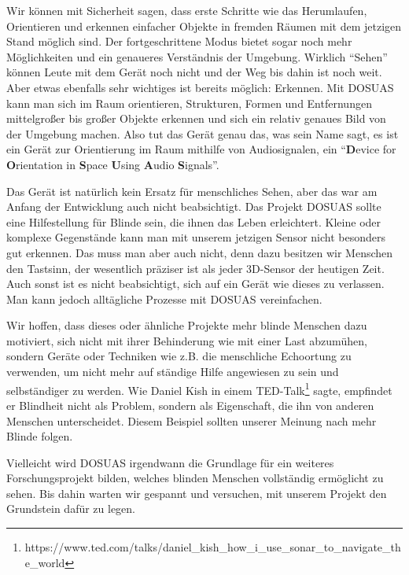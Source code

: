 \documentclass[a4paper,12pt,ngerman]{scrartcl}
\begin{document}
Wir können mit Sicherheit sagen, dass erste Schritte wie das Herumlaufen, Orientieren und erkennen einfacher
Objekte in fremden Räumen mit dem jetzigen Stand möglich sind. Der fortgeschrittene Modus bietet sogar noch mehr 
Möglichkeiten und ein genaueres Verständnis der Umgebung.
Wirklich \enquote{Sehen} können Leute mit dem Gerät noch nicht und der Weg bis dahin ist noch weit.
Aber etwas ebenfalls sehr wichtiges
ist bereits möglich: Erkennen. Mit DOSUAS kann man sich im Raum orientieren, Strukturen, Formen und Entfernungen
mittelgroßer bis großer Objekte erkennen und sich ein relativ genaues Bild von der Umgebung machen. 
Also tut das Gerät genau das, was sein Name sagt, es ist ein Gerät zur Orientierung im Raum mithilfe von Audiosignalen,
ein \enquote{\textbf{D}evice for \textbf{O}rientation in \textbf{S}pace \textbf{U}sing 
\textbf{A}udio \textbf{S}ignals}.\par 
Das Gerät ist natürlich kein Ersatz für menschliches Sehen, aber das war am Anfang der Entwicklung
auch nicht beabsichtigt. Das Projekt DOSUAS sollte eine Hilfestellung für Blinde sein, die ihnen das Leben erleichtert.
Kleine oder komplexe Gegenstände kann man mit unserem jetzigen Sensor nicht besonders gut erkennen. Das muss man aber
auch nicht, denn dazu besitzen wir Menschen den Tastsinn, der wesentlich präziser ist
als jeder 3D-Sensor der heutigen Zeit. Auch sonst ist es nicht beabsichtigt, sich auf 
ein Gerät wie dieses zu verlassen. Man kann jedoch alltägliche Prozesse mit DOSUAS vereinfachen.\par
Wir hoffen, dass dieses oder ähnliche Projekte mehr blinde Menschen dazu motiviert, sich nicht 
mit ihrer Behinderung wie mit einer Last abzumühen, sondern Geräte oder Techniken
wie z.B. die menschliche Echoortung zu verwenden, um nicht mehr auf ständige Hilfe angewiesen 
zu sein und selbständiger zu werden. Wie Daniel Kish in einem TED-Talk\footnote{https://www.ted.com/talks/daniel\_kish\_how\_i\_use\_sonar\_to\_navigate\_the\_world} sagte, 
empfindet er Blindheit nicht als Problem, sondern als Eigenschaft, die ihn von anderen Menschen
unterscheidet. Diesem Beispiel sollten unserer Meinung nach mehr Blinde folgen.\par 
Vielleicht wird DOSUAS irgendwann die Grundlage für ein weiteres
Forschungsprojekt bilden, welches blinden Menschen vollständig ermöglicht zu sehen. Bis dahin
warten wir gespannt und versuchen, mit unserem Projekt den Grundstein dafür zu legen. 

\newpage
\end{document}
